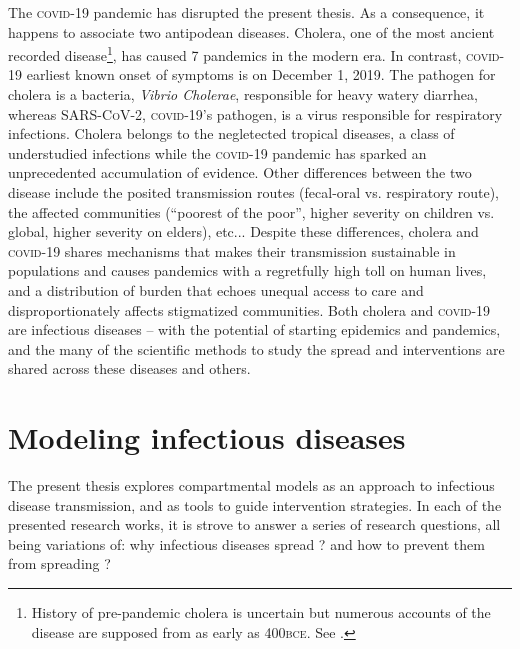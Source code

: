 The \textsc{covid}-19 pandemic has disrupted the present thesis. As a consequence, it happens to associate two antipodean diseases. Cholera, one of the most ancient recorded disease\footnote[][10\baselineskip]{History of pre-pandemic cholera is uncertain but numerous accounts of the disease are supposed from as early as 400\textsc{bce}. See .}, has caused 7 pandemics in the modern era. In contrast, \textsc{covid}-19 earliest known onset of symptoms is on December 1, 2019. The pathogen for cholera is a bacteria, \textit{Vibrio Cholerae}, responsible for heavy watery diarrhea, whereas \textsc{SARS-CoV-2}, \textsc{covid}-19’s pathogen, is a virus responsible for respiratory infections. Cholera belongs to the negletected tropical diseases, a class of understudied infections while the \textsc{covid}-19 pandemic has sparked an unprecedented accumulation of evidence. 
Other differences between the two disease include the posited transmission routes (fecal-oral vs. respiratory route), the affected communities (``poorest of the poor”, higher severity on children vs. global, higher severity on elders), etc... Despite these differences, cholera and \textsc{covid}-19 shares mechanisms that makes their transmission sustainable in populations and causes pandemics with a regretfully high toll on human lives, and a distribution of burden that echoes unequal access to care and disproportionately affects stigmatized communities. Both cholera and \textsc{covid}-19 are infectious diseases -- with the potential of starting epidemics and pandemics, and the many of the scientific methods to study the spread and interventions are shared across these diseases and others.

\section{Modeling infectious diseases}
The present thesis explores compartmental models as an approach to infectious disease transmission, and as tools to guide intervention strategies. In each of the presented research works, it is strove to answer a series of research questions, all being variations of: why infectious diseases spread ? and how to prevent them from spreading ?


